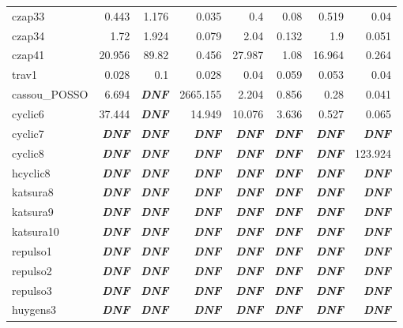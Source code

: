 \documentclass[letterpaper,12pt,titlepage,oneside,final]{book}
\begin{document}
\begin{center}
\begin{tabular}{| l || r | r | r || r | r || r | r ||}
  czap33 & 0.443 & 1.176 & 0.035 & 0.4 & 0.08 & 0.519 & 0.04\\
  czap34 & 1.72 & 1.924 & 0.079 & 2.04 & 0.132 & 1.9 & 0.051\\
  czap41 & 20.956 & 89.82 & 0.456 & 27.987 & 1.08 & 16.964 & 0.264\\
  trav1 & 0.028 & 0.1 & 0.028 & 0.04 & 0.059 & 0.053 & 0.04\\
  cassou\_POSSO & 6.694 & \textbf{\textit{DNF}} & 2665.155 & 2.204 & 0.856 & 0.28 & 0.041\\
  cyclic6 & 37.444 & \textbf{\textit{DNF}} & 14.949 & 10.076 & 3.636 & 0.527 & 0.065\\
  cyclic7 & \textbf{\textit{DNF}} & \textbf{\textit{DNF}} & \textbf{\textit{DNF}} & \textbf{\textit{DNF}} & \textbf{\textit{DNF}} & \textbf{\textit{DNF}} & \textbf{\textit{DNF}}\\
  cyclic8 & \textbf{\textit{DNF}} & \textbf{\textit{DNF}} & \textbf{\textit{DNF}} & \textbf{\textit{DNF}} & \textbf{\textit{DNF}} & \textbf{\textit{DNF}} & 123.924\\
  hcyclic8 & \textbf{\textit{DNF}} & \textbf{\textit{DNF}} & \textbf{\textit{DNF}} & \textbf{\textit{DNF}} & \textbf{\textit{DNF}} & \textbf{\textit{DNF}} & \textbf{\textit{DNF}}\\
  katsura8 & \textbf{\textit{DNF}} & \textbf{\textit{DNF}} & \textbf{\textit{DNF}} & \textbf{\textit{DNF}} & \textbf{\textit{DNF}} & \textbf{\textit{DNF}} & \textbf{\textit{DNF}}\\
  katsura9 & \textbf{\textit{DNF}} & \textbf{\textit{DNF}} & \textbf{\textit{DNF}} & \textbf{\textit{DNF}} & \textbf{\textit{DNF}} & \textbf{\textit{DNF}} & \textbf{\textit{DNF}}\\
  katsura10 & \textbf{\textit{DNF}} & \textbf{\textit{DNF}} & \textbf{\textit{DNF}} & \textbf{\textit{DNF}} & \textbf{\textit{DNF}} & \textbf{\textit{DNF}} & \textbf{\textit{DNF}}\\
  repulso1 & \textbf{\textit{DNF}} & \textbf{\textit{DNF}} & \textbf{\textit{DNF}} & \textbf{\textit{DNF}} & \textbf{\textit{DNF}} & \textbf{\textit{DNF}} & \textbf{\textit{DNF}}\\
  repulso2 & \textbf{\textit{DNF}} & \textbf{\textit{DNF}} & \textbf{\textit{DNF}} & \textbf{\textit{DNF}} & \textbf{\textit{DNF}} & \textbf{\textit{DNF}} & \textbf{\textit{DNF}}\\
  repulso3 & \textbf{\textit{DNF}} & \textbf{\textit{DNF}} & \textbf{\textit{DNF}} & \textbf{\textit{DNF}} & \textbf{\textit{DNF}} & \textbf{\textit{DNF}} & \textbf{\textit{DNF}}\\
  huygens3 & \textbf{\textit{DNF}} & \textbf{\textit{DNF}} & \textbf{\textit{DNF}} & \textbf{\textit{DNF}} & \textbf{\textit{DNF}} & \textbf{\textit{DNF}} & \textbf{\textit{DNF}}
  \\ %
  \hline
  \end{tabular}
\end{center}
\doublespacing
\end{document}
